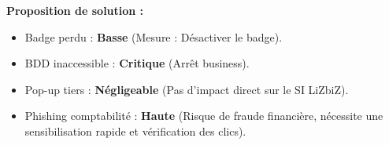 \begin{boxlizbiz}
\textbf{Proposition de solution :}
\begin{itemize}
    \item Badge perdu : \textbf{Basse} (Mesure : Désactiver le badge).
    \item BDD inaccessible : \textbf{Critique} (Arrêt business).
    \item Pop-up tiers : \textbf{Négligeable} (Pas d'impact direct sur le SI LiZbiZ).
    \item Phishing comptabilité : \textbf{Haute} (Risque de fraude financière, nécessite une sensibilisation rapide et vérification des clics).
\end{itemize}
\end{boxlizbiz}

